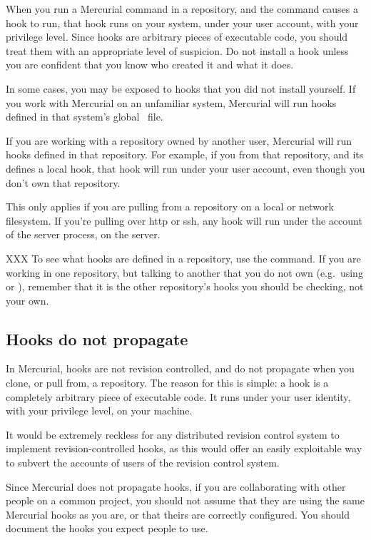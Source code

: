 When you run a Mercurial command in a repository, and the command
causes a hook to run, that hook runs on your system, under your user
account, with your privilege level.  Since hooks are arbitrary pieces
of executable code, you should treat them with an appropriate level of
suspicion.  Do not install a hook unless you are confident that you
know who created it and what it does.

In some cases, you may be exposed to hooks that you did not install
yourself.  If you work with Mercurial on an unfamiliar system,
Mercurial will run hooks defined in that system's global \hgrc\ file.

If you are working with a repository owned by another user, Mercurial
will run hooks defined in that repository.  For example, if you
 from that repository, and its 
defines a local  hook, that hook will run under your
user account, even though you don't own that repository.

\begin{note}
  This only applies if you are pulling from a repository on a local or
  network filesystem.  If you're pulling over http or ssh, any
   hook will run under the account of the server
  process, on the server.
\end{note}

XXX To see what hooks are defined in a repository, use the
 command.  If you are working in one
repository, but talking to another that you do not own (e.g.~using
 or ), remember that it is the other
repository's hooks you should be checking, not your own.

\subsection{Hooks do not propagate}

In Mercurial, hooks are not revision controlled, and do not propagate
when you clone, or pull from, a repository.  The reason for this is
simple: a hook is a completely arbitrary piece of executable code.  It
runs under your user identity, with your privilege level, on your
machine.

It would be extremely reckless for any distributed revision control
system to implement revision-controlled hooks, as this would offer an
easily exploitable way to subvert the accounts of users of the
revision control system.

Since Mercurial does not propagate hooks, if you are collaborating
with other people on a common project, you should not assume that they
are using the same Mercurial hooks as you are, or that theirs are
correctly configured.  You should document the hooks you expect people
to use.

